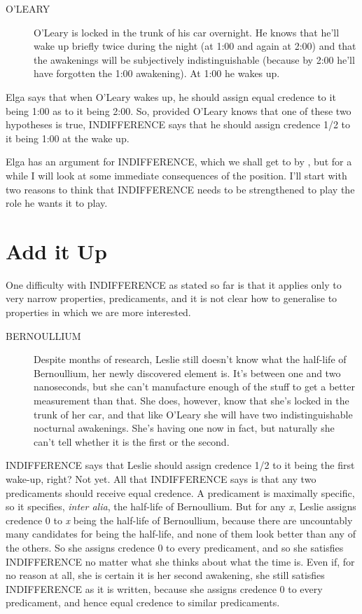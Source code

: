 \begin{description}
\item[O'LEARY] O'Leary is locked in the trunk of his car overnight. He knows that he'll wake up briefly twice during the night (at 1:00 and again at 2:00) and that the awakenings will be subjectively indistinguishable (because by 2:00 he'll have forgotten the 1:00 awakening). At 1:00 he wakes up.
\end{description}

\noindent Elga says that when O'Leary wakes up, he should assign equal credence to it being 1:00 as to it being 2:00. So, provided O'Leary knows that one of these two hypotheses is true, INDIFFERENCE says that he should assign credence 1/2 to it being 1:00 at the wake up.

Elga has an argument for INDIFFERENCE, which we shall get to by , but for a while I will look at some immediate consequences of the position. I'll start with two reasons to think that INDIFFERENCE needs to be strengthened to play the role he wants it to play.

\section{Add it Up}

One difficulty with INDIFFERENCE as stated so far is that it applies only to very narrow properties, predicaments, and it is not clear how to generalise to properties in which we are more interested.

\begin{description}
\item [BERNOULLIUM] Despite months of research, Leslie still doesn't know what the half-life of Bernoullium, her newly discovered element is. It's between one and two nanoseconds, but she can't manufacture enough of the stuff to get a better measurement than that. She does, however, know that she's locked in the trunk of her car, and that like O'Leary she will have two indistinguishable nocturnal awakenings. She's having one now in fact, but naturally she can't tell whether it is the first or the second.
\end{description}

\noindent INDIFFERENCE says that Leslie should assign credence 1/2 to it being the first wake-up, right? Not yet. All that INDIFFERENCE says is that any two predicaments should receive equal credence. A predicament is maximally specific, so it specifies, \textit{inter alia}, the half-life of Bernoullium. But for any \textit{x}, Leslie assigns credence 0 to \textit{x} being the half-life of Bernoullium, because there are uncountably many candidates for being the half-life, and none of them look better than any of the others. So she assigns credence 0 to every predicament, and so she satisfies INDIFFERENCE no matter what she thinks about what the time is. Even if, for no reason at all, she is certain it is her second awakening, she still satisfies INDIFFERENCE as it is written, because she assigns credence 0 to every predicament, and hence equal credence to similar predicaments.

